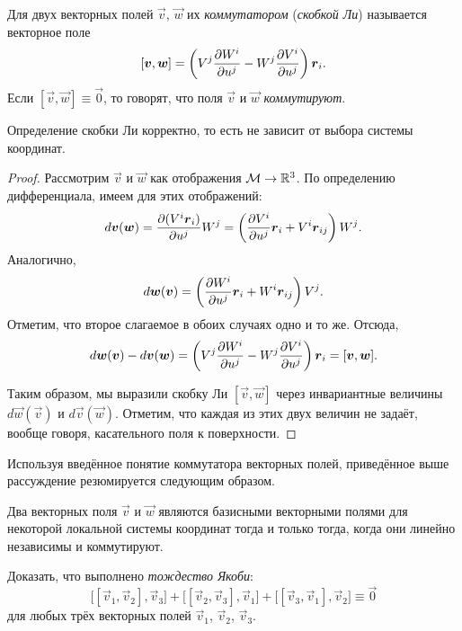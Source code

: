 \begin{definition}
	Для двух векторных полей $\vec{v}$, $\vec{w}$ их \textit{коммутатором} (\textit{скобкой Ли}) называется векторное поле
	\[
		[\boldsymbol{v}, \boldsymbol{w}] = \left(V^j\frac{\partial W^i}{\partial u^j} - W^j\frac{\partial V^i}{\partial u^j}\right)\boldsymbol{r}_i.
	\]
	Если $[\vec{v}, \vec{w}] \equiv \vec{0}$, то говорят, что поля $\vec{v}$ и $\vec{w}$ \textit{коммутируют}.
\end{definition}


\begin{proposition}
	Определение скобки Ли корректно, то есть не зависит от выбора системы координат.
\end{proposition}

\begin{proof}
	Рассмотрим $\vec{v}$ и $\vec{w}$ как отображения $\mathcal{M} \to \mathbb{R}^3$. По определению дифференциала, имеем для этих отображений:
	\[
		d\boldsymbol{v}(\boldsymbol{w}) = \frac{\partial(V^i\boldsymbol{r}_i)}{\partial u^j}W^j = \left(\frac{\partial V^i}{\partial u^j}\boldsymbol{r}_i + V^i\boldsymbol{r}_{ij}\right)W^j.
	\]
	Аналогично,
	\[
		d\boldsymbol{w}(\boldsymbol{v}) = \left(\frac{\partial W^i}{\partial u^j}\boldsymbol{r}_i + W^i\boldsymbol{r}_{ij}\right)V^j.
	\]
	Отметим, что второе слагаемое в обоих случаях одно и то же. Отсюда,
	\[
		d\boldsymbol{w}(\boldsymbol{v}) - d\boldsymbol{v}(\boldsymbol{w}) = \left(V^j\frac{\partial W^i}{\partial u^j} - W^j\frac{\partial V^i}{\partial u^j}\right)\boldsymbol{r}_i = [\boldsymbol{v}, \boldsymbol{w}].
	\]

	Таким образом, мы выразили скобку Ли $[\vec{v}, \vec{w}]$ через инвариантные величины $d\vec{w}(\vec{v})$ и $d\vec{v}(\vec{w})$. Отметим, что каждая из этих двух величин не задаёт, вообще говоря, касательного поля к поверхности.
\end{proof}

Используя введённое понятие коммутатора векторных полей, приведённое выше рассуждение резюмируется следующим образом.

\begin{theorem}
	Два векторных поля $\vec{v}$ и $\vec{w}$ являются базисными векторными полями для некоторой локальной системы координат тогда и только тогда, когда они линейно независимы и коммутируют.
\end{theorem}

\begin{problem}
	Доказать, что выполнено \textit{тождество Якоби}:
	\[
		\big[[\vec{v}_1, \vec{v}_2], \vec{v}_3\big] +
		\big[[\vec{v}_2, \vec{v}_3], \vec{v}_1\big] +
		\big[[\vec{v}_3, \vec{v}_1], \vec{v}_2\big] \equiv \vec{0}
	\]
	для любых трёх векторных полей $\vec{v}_1$, $\vec{v}_2$, $\vec{v}_3$.
\end{problem}

